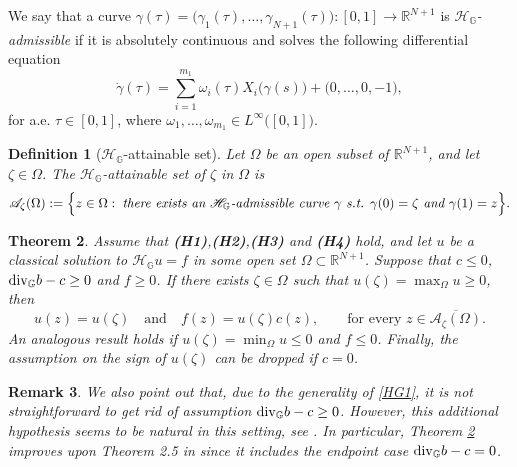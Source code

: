 \documentclass[11pt,a4paper]{article}
\newtheorem{theorem}{\bf Theorem}[section]
\newtheorem{definition}[theorem]{\bf Definition}
\newtheorem{remark}[theorem]{\bf Remark}
\numberwithin{equation}{section}
\def \rnn {{\mathbb {R}}^{N+1}}
\def \GG {{\mathbb{G}}}
\def \div {{\text{\rm div}}}
\def \H {\mathscr{H}_\GG}
\def \t {{\tau}}
\def \z {{\zeta}}
\def \O {{\Omega}}
\def \AA {{ \mathscr{A}_{\z} }}
\begin{document}
{We say that a curve $\gamma(\t)=\big(\gamma_1(\t),\ldots,\gamma_{N+1}(\t)\big):[0,1]\to \rnn$ is \textit{$\H$-admissible} if it is absolutely continuous and solves the following differential equation
\begin{equation}
	\dot{\gamma}(\t)=\sum_{i=1}^{m_1}\omega_i(\t)X_i\big(\gamma(s)\big)+ \big(0,\ldots,0,-1\big),
\end{equation}
for a.e. $\t\in [0,1]$, where $\omega_1,\ldots,\omega_{m_1}\in L^\infty\big([0,1]\big)$.
\begin{definition}[$\H$-attainable set]
	Let $\O$ be an open subset of $\rnn$, and let $\z\in\O$. The $\H$-attainable set of $\z$ in $\O$ is
	\begin{equation}
		\AA(\O):=\Big\{z\in\O :\; \emph{there exists an $\H$-admissible curve $\gamma$ s.t. $\gamma(0)=\z$ and $\gamma(1)=z$}\Big\}.
	\end{equation}
\end{definition}
\begin{theorem}\label{Th-maximum}
	Assume that \textbf{(H1)},\textbf{(H2)},\textbf{(H3)} and \textbf{(H4)} hold, and let  $u$ be a classical solution to $\H u=f$ in some open set $\O\subset \rnn$. Suppose that $c\leq 0$, $\div_\GG b-c\geq 0$   and $f\geq 0$. If there exists $\z\in\O$ such that $u(\z)=\max_\O u\geq 0$, then
	\begin{equation}
		u(z)=u(\z)\quad \text{and}\quad f(z)=u(\z)c(z),\qquad \text{for every } z\in \overline{\AA(\O)}. 
	\end{equation}
	An analogous result holds if $u(\z)=\min_\O u\leq 0$ and $f\leq0$.  Finally, the assumption on the sign of $u(\z)$ can be dropped if $c=0$. 
\end{theorem}
\begin{remark}
	We also point out that, due to the generality of \eqref{HG1}, it is not straightforward to get rid of  assumption $\div_\GG b-c\geq 0$. However, this additional hypothesis seems to be natural in this setting, see \cite{pallara2023meanvalueformulasclassical}. In particular, Theorem \ref{Th-maximum} improves upon Theorem 2.5 in \cite{pallara2023meanvalueformulasclassical} since it includes the endpoint case $\div_\GG b-c=0$.  
\end{remark}

\medskip

}
\end{document}
